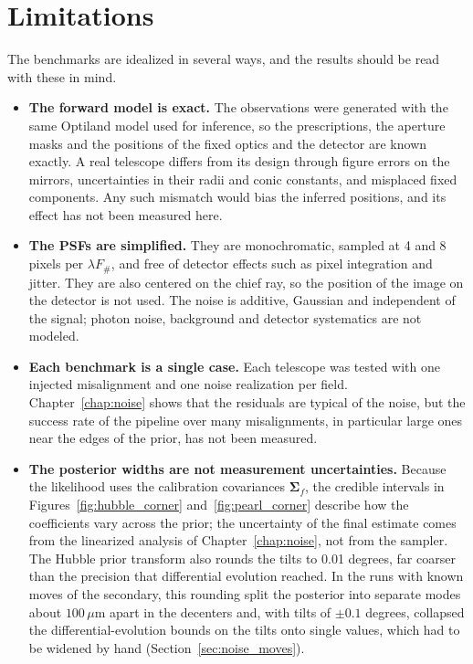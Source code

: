 \section{Limitations}\label{sec:conc_limits}

The benchmarks are idealized in several ways, and the results should be read with these in mind.
\begin{itemize}
    \item \textbf{The forward model is exact.} The observations were generated with the same Optiland model used for inference, so the prescriptions, the aperture masks and the positions of the fixed optics and the detector are known exactly. A real telescope differs from its design through figure errors on the mirrors, uncertainties in their radii and conic constants, and misplaced fixed components. Any such mismatch would bias the inferred positions, and its effect has not been measured here.
    \item \textbf{The PSFs are simplified.} They are monochromatic, sampled at 4 and 8 pixels per $\lambda F_\#$, and free of detector effects such as pixel integration and jitter. They are also centered on the chief ray, so the position of the image on the detector is not used. The noise is additive, Gaussian and independent of the signal; photon noise, background and detector systematics are not modeled.
    \item \textbf{Each benchmark is a single case.} Each telescope was tested with one injected misalignment and one noise realization per field. Chapter~\ref{chap:noise} shows that the residuals are typical of the noise, but the success rate of the pipeline over many misalignments, in particular large ones near the edges of the prior, has not been measured.
    \item \textbf{The posterior widths are not measurement uncertainties.} Because the likelihood uses the calibration covariances $\boldsymbol{\Sigma}_f$, the credible intervals in Figures~\ref{fig:hubble_corner} and~\ref{fig:pearl_corner} describe how the coefficients vary across the prior; the uncertainty of the final estimate comes from the linearized analysis of Chapter~\ref{chap:noise}, not from the sampler. The Hubble prior transform also rounds the tilts to 0.01 degrees, far coarser than the precision that differential evolution reached. In the runs with known moves of the secondary, this rounding split the posterior into separate modes about $100\,\mu\mathrm{m}$ apart in the decenters and, with tilts of $\pm0.1$ degrees, collapsed the differential-evolution bounds on the tilts onto single values, which had to be widened by hand (Section~\ref{sec:noise_moves}).

\end{itemize}
